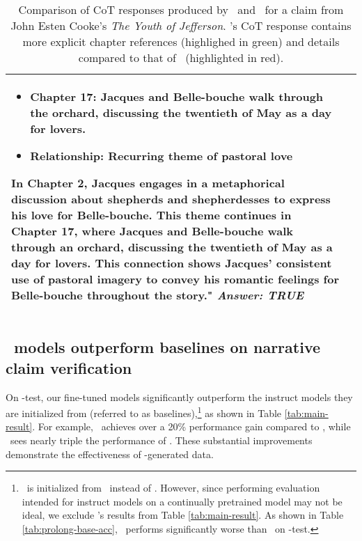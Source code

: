 \begin{table*}[htbp]
{\begin{tabular}[t]{p{} p{}}
{\begin{itemize}[leftmargin=*]
            \item {\color{teal}Chapter 17}: Jacques and Belle-bouche walk through the orchard, discussing the twentieth of May as a day for lovers.
            \item Relationship: Recurring theme of pastoral love
        \end{itemize}
        In {\color{teal}Chapter 2}, Jacques engages in a metaphorical discussion about shepherds and shepherdesses to express his love for Belle-bouche. This theme continues in {\color{teal}Chapter 17}, where Jacques and Belle-bouche walk through an orchard, discussing the twentieth of May as a day for lovers. This connection shows Jacques' consistent use of pastoral imagery to convey his romantic feelings for Belle-bouche throughout the story." \newline \textit{Answer: TRUE}%
        \vspace{2pt}
        } \\
        \bottomrule
        \end{tabular}
    }
    \caption{Comparison of CoT responses produced by \llamainst\ and \llamaftbalanced\ for a claim from John Esten Cooke's \textit{The Youth of Jefferson}. \llamaftbalanced's CoT response contains more explicit chapter references (highlighed in {\color{teal}green}) and details compared to that of \llamainst\ (highlighted in {\color{purple}red}).}
    \label{tab:cot-examples} 
    \vspace{-0.2in} 
\end{table*}


\subsection{\pipeline\ models outperform baselines on narrative claim verification} \label{subsec:main_results}

On \pipeline-test, our fine-tuned models significantly outperform the instruct models they are initialized from (referred to as baselines),\footnote{\prolongftbalanced\ is initialized from \prolongbase\ instead of \prolonginst. However, since performing evaluation intended for instruct models on a continually pretrained model may not be ideal, we exclude \prolongbase's results from Table \ref{tab:main-result}. As shown in Table \ref{tab:prolong-base-acc}, \prolongbase\ performs significantly worse than \prolonginst\ on \pipeline-test.} as shown in Table \ref{tab:main-result}. 
For example, \qwenftbalanced\ achieves over a 20\% performance gain compared to \qweninst, while \llamaftbalanced\ sees nearly triple the performance of \llamainst. These substantial improvements demonstrate the effectiveness of \pipeline-generated data.

